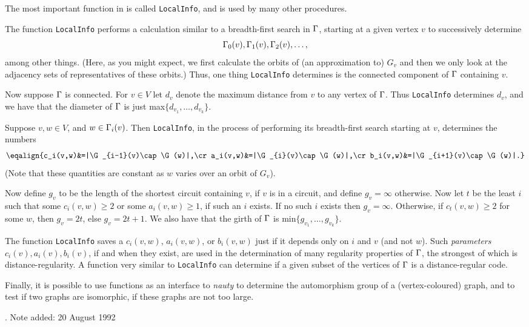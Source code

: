 The most important function in {\GRAPE} is called {\tt LocalInfo},
and is used by many other procedures. 

The function {\tt LocalInfo} performs a calculation similar to
a breadth-first search in $\Gamma$, 
starting at a given vertex $v$ to successively determine 
$$\Gamma_0(v),\Gamma_1(v),\Gamma_2(v),\ldots,$$ among other things. (Here, as you might
expect, we first calculate the orbits of (an approximation to) 
$G_v$ and then we only look at the adjacency sets of 
representatives of these orbits.)
Thus, one thing {\tt LocalInfo} determines is the connected component
of $\Gamma$ containing $v$. 

Now suppose $\Gamma$ is connected. For $v\in V$ let $d_v$ denote 
the maximum distance from $v$ to any vertex of $\Gamma$.
Thus {\tt LocalInfo} determines $d_v$, and we have that
the diameter of $\Gamma$ is just max$\{d_{v_1},\ldots,d_{v_k}\}$.

Suppose $v,w\in V$, and $w\in\Gamma_i(v)$. Then {\tt LocalInfo},
in the process of performing its breadth-first search starting at
$v$, determines the numbers
$$\eqalign{c_i(v,w)&=|\G_{i-1}(v)\cap\G(w)|,\cr
a_i(v,w)&=|\G_{i}(v)\cap\G(w)|,\cr
b_i(v,w)&=|\G_{i+1}(v)\cap\G(w)|.}$$
(Note that these quantities are constant as $w$ varies
over an orbit of $G_v$).

Now define $g_v$ to be the length of the shortest circuit 
containing $v$, if $v$ is in a circuit, and define $g_v=\infty$
otherwise. Now let $t$ be the least $i$ such that 
some $c_i(v,w)\ge2$ or some $a_i(v,w)\ge1$, if such an 
$i$ exists. If no such $i$ exists then $g_v=\infty$.
Otherwise, if $c_t(v,w)\ge2$ for some $w$, then $g_v=2t$, else
$g_v=2t+1$. We also have that the girth
of $\Gamma$ is min$\{g_{v_1},\ldots,g_{v_k}\}$.   

The function {\tt LocalInfo} saves a $c_i(v,w)$, $a_i(v,w)$, or
$b_i(v,w)$ just if it depends only on $i$ and $v$ (and not 
$w$). Such {\it parameters} $c_i(v),a_i(v),b_i(v)$,
if and when they exist,
are used in the determination of many regularity properties of
$\Gamma$, the strongest of which is distance-regularity.            
A function very similar to {\tt LocalInfo}
can determine if a given subset of the vertices of $\Gamma$ is
a distance-regular code.
   
Finally, it is possible to use {\GRAPE} functions as an 
interface to {\it nauty} to determine the automorphism group
of a (vertex-coloured) graph, and to test if two graphs 
are isomorphic, if these graphs are not too large.

. Note added: 20 August 1992                %
\endhead                             %

